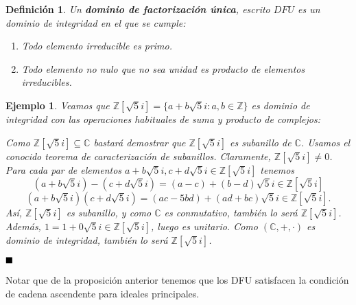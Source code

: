 \documentclass[12pt]{article}
\newtheorem{definition}[theorem]{Definición}
\newtheorem{example}{Ejemplo}[theorem]
\begin{document}
\begin{definition}\label{eq:defdfu} Un \textbf{dominio de factorización única}, escrito $DFU$ es un dominio de integridad en el que se cumple: \begin{enumerate}
\item Todo elemento irreducible es primo.
\item Todo elemento no nulo que no sea unidad es producto de elementos irreducibles.
\end{enumerate}
\end{definition}

\begin{example}Veamos que $\mathbb{Z}[\sqrt{5}i] = \lbrace a + b\sqrt{5}i: a,b \in \mathbb{Z} \rbrace$ es dominio de integridad con las operaciones habituales de suma y producto de complejos:

Como $\mathbb{Z}[\sqrt{5}i]\subseteq \mathbb{C}$ bastará demostrar que $\mathbb{Z}[\sqrt{5}i]$ es subanillo de $\mathbb{C}$. Usamos el conocido teorema de caracterización de subanillos. Claramente, $\mathbb{Z}[\sqrt{5}i] \neq 0$. Para cada par de elementos $a+b \sqrt{5}i, c+d\sqrt{5}i \in \mathbb{Z}[\sqrt{5}i]$ tenemos $$(a+b\sqrt{5}i)-(c+d\sqrt{5}i) = (a-c)+(b-d)\sqrt{5}i\in \mathbb{Z}[\sqrt{5}i]$$ $$(a+b\sqrt{5}i)(c+d\sqrt{5}i) = (ac-5bd)+(ad+bc)\sqrt{5}i\in \mathbb{Z}[\sqrt{5}i].$$ Así, $\mathbb{Z}[\sqrt{5}i]$ es subanillo, y como $\mathbb{C}$ es conmutativo, también lo será $\mathbb{Z}[\sqrt{5}i]$. Además, $1 = 1+0 \sqrt{5}i \in \mathbb{Z}[\sqrt{5}i]$, luego es unitario. Como $(\mathbb{C}, +, \cdot)$ es dominio de integridad, también lo será $\mathbb{Z}[\sqrt{5}i]$.
\end{example}

$\hfill \blacksquare$

Notar que de la proposición anterior tenemos que los DFU satisfacen la condición de cadena ascendente para ideales principales.
\end{document}
